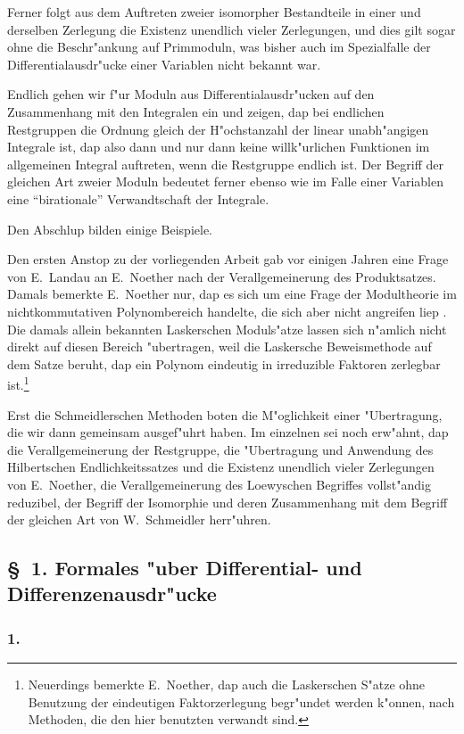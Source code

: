 \documentclass[12pt,a4paper]{article}
\begin{document}
Ferner folgt aus dem Auftreten zweier isomorpher Bestandteile in einer und derselben Zerlegung die Existenz unendlich vieler Zerlegungen, und dies gilt sogar ohne die Beschr"ankung auf Primmoduln, was bisher auch im Spezialfalle der Differentialausdr"ucke einer Variablen nicht bekannt war.

Endlich gehen wir f"ur Moduln aus Differentialausdr"ucken auf den Zusammenhang mit den Integralen ein und zeigen, dap bei endlichen Restgruppen die Ordnung gleich der H"ochstanzahl der linear unabh"angigen Integrale ist, dap also dann und nur dann keine willk"urlichen Funktionen im allgemeinen Integral auftreten, wenn die Restgruppe endlich ist. Der Begriff der gleichen Art zweier Moduln bedeutet ferner ebenso wie im Falle einer Variablen eine ``birationale'' Verwandtschaft der Integrale.

Den Abschlup bilden einige Beispiele.

Den ersten Anstop zu der vorliegenden Arbeit gab vor einigen Jahren eine Frage von E.\ Landau an E.\ Noether nach der Verallgemeinerung des Produktsatzes. Damals bemerkte E.\ Noether nur, dap es sich um eine Frage der Modultheorie im nichtkommutativen Polynombereich handelte, die sich aber nicht angreifen liep . Die damals allein bekannten Laskerschen Moduls"atze lassen sich n"amlich nicht direkt auf diesen Bereich "ubertragen, weil die Laskersche Beweismethode auf dem Satze beruht, dap ein Polynom eindeutig in irreduzible Faktoren zerlegbar ist.\footnote{Neuerdings bemerkte E.\ Noether, dap auch die Laskerschen S"atze ohne Benutzung der eindeutigen Faktorzerlegung begr"undet werden k"onnen, nach Methoden, die den hier benutzten verwandt sind.}

Erst die Schmeidlerschen Methoden boten die M"oglichkeit einer "Ubertragung, die wir dann gemeinsam ausgef"uhrt haben. Im einzelnen sei noch erw"ahnt, dap die Verallgemeinerung der Restgruppe, die "Ubertragung und Anwendung des Hilbertschen Endlichkeitssatzes und die Existenz unendlich vieler Zerlegungen von E.\ Noether, die Verallgemeinerung des Loewyschen Begriffes vollst"andig reduzibel, der Begriff der Isomorphie und deren Zusammenhang mit dem Begriff der gleichen Art von W.\ Schmeidler herr"uhren.

\subsection*{\S\ 1. Formales "uber Differential- und Differenzenausdr"ucke}

\subsubsection*{1.}
\end{document}
